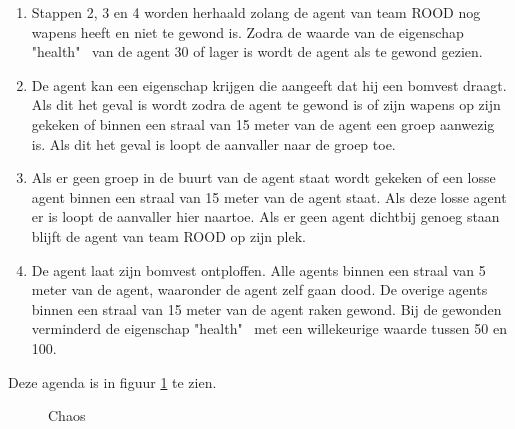 \documentclass[12pt, letterpaper]{article}
\begin{document}
\begin{itemize}
{\begin{enumerate}
\begin{list}{$\circ$}{}
                \end{list}
                \item Stappen 2, 3 en 4 worden herhaald zolang de agent van team ROOD nog wapens heeft en niet te gewond is. Zodra de waarde van de eigenschap "health" \ van de agent 30 of lager is wordt de agent als te gewond gezien.
                \item De agent kan een eigenschap krijgen die aangeeft dat hij een bomvest draagt. Als dit het geval is wordt zodra de agent te gewond is of zijn wapens op zijn gekeken of binnen een straal van 15 meter van de agent een groep aanwezig is. Als dit het geval is loopt de aanvaller naar de groep toe.
                \item Als er geen groep in de buurt van de agent staat wordt gekeken of een losse agent binnen een straal van 15 meter van de agent staat. Als deze losse agent er is loopt de aanvaller hier naartoe. Als er geen agent dichtbij genoeg staan blijft de agent van team ROOD op zijn plek.
                \item De agent laat zijn bomvest ontploffen. Alle agents binnen een straal van 5 meter van de agent, waaronder de agent zelf gaan dood. De overige agents binnen een straal van 15 meter van de agent raken gewond. Bij de gewonden verminderd de eigenschap "health" \ met een willekeurige waarde tussen 50 en 100.
            \end{enumerate}
        }  
    Deze agenda is in figuur \ref{14} te zien.           
    \begin{figure}[H]
        \centering
        \caption{Chaos}
        \label{14}
    \end{figure}
    
\end{itemize}
\end{document}
